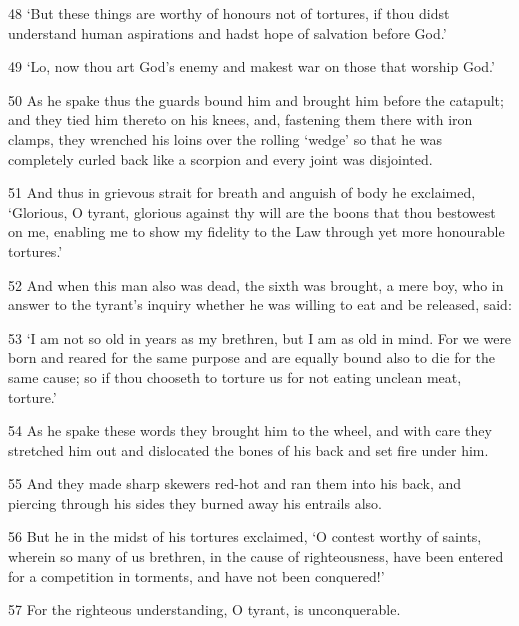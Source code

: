 \par 48 ‘But these things are worthy of honours not of tortures, if thou didst understand human aspirations and hadst hope of salvation before God.’

\par 49 ‘Lo, now thou art God's enemy and makest war on those that worship God.’

\par 50 As he spake thus the guards bound him and brought him before the catapult; and they tied him thereto on his knees, and, fastening them there with iron clamps, they wrenched his loins over the rolling ‘wedge’ so that he was completely curled back like a scorpion and every joint was disjointed.

\par 51 And thus in grievous strait for breath and anguish of body he exclaimed, ‘Glorious, O tyrant, glorious against thy will are the boons that thou bestowest on me, enabling me to show my fidelity to the Law through yet more honourable tortures.’

\par 52 And when this man also was dead, the sixth was brought, a mere boy, who in answer to the tyrant's inquiry whether he was willing to eat and be released, said:

\par 53 ‘I am not so old in years as my brethren, but I am as old in mind. For we were born and reared for the same purpose and are equally bound also to die for the same cause; so if thou chooseth to torture us for not eating unclean meat, torture.’

\par 54 As he spake these words they brought him to the wheel, and with care they stretched him out and dislocated the bones of his back and set fire under him.

\par 55 And they made sharp skewers red-hot and ran them into his back, and piercing through his sides they burned away his entrails also.

\par 56 But he in the midst of his tortures exclaimed, ‘O contest worthy of saints, wherein so many of us brethren, in the cause of righteousness, have been entered for a competition in torments, and have not been conquered!’

\par 57 For the righteous understanding, O tyrant, is unconquerable.

